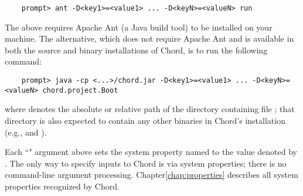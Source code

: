 \begin{verbatim}
    prompt> ant -D<key1>=<value1> ... -D<keyN>=<valueN> run
\end{verbatim}

The above requires Apache Ant (a Java build tool) to be installed on
your machine.  The alternative, which does not require Apache Ant and is
available in both the source and binary installations of Chord, is
to run the following command:

\begin{verbatim}
    prompt> java -cp <...>/chord.jar -D<key1>=<value1> ... -D<keyN>=<valueN> chord.project.Boot
\end{verbatim}

where  denotes the absolute or relative path of the
directory containing file ; that directory is also
expected to contain any other binaries in Chord's installation (e.g.,
 and ).

Each ``" argument above sets the system property
named  to the value denoted by .  The only
way to specify inputs to Chord is via system properties; there is no
command-line argument processing.  Chapter\ref{chap:properties}
describes all system properties recognized by Chord.

